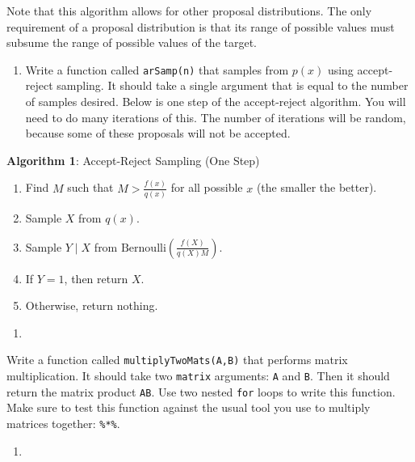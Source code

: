 \documentclass[
  12pt,
  krantz2]{krantz}
\providecommand{\tightlist}{%
  \setlength{\itemsep}{0pt}\setlength{\parskip}{0pt}}
\begin{document}
Note that this algorithm allows for other proposal distributions. The only requirement of a proposal distribution is that its range of possible values must subsume the range of possible values of the target.

\begin{enumerate}
\def\labelenumi{\alph{enumi})}
\tightlist
\item
  Write a function called \texttt{arSamp(n)} that samples from \(p(x)\) using accept-reject sampling. It should take a single argument that is equal to the number of samples desired. Below is one step of the accept-reject algorithm. You will need to do many iterations of this. The number of iterations will be random, because some of these proposals will not be accepted.
\end{enumerate}

\textbf{Algorithm 1}: Accept-Reject Sampling (One Step)

\begin{enumerate}
\def\labelenumi{\roman{enumi}.}
\tightlist
\item
  Find \(M\) such that \(M > \frac{f(x)}{q(x)}\) for all possible \(x\) (the smaller the better).
\item
  Sample \(X\) from \(q(x)\).
\item
  Sample \(Y \mid X\) from \(\text{Bernoulli}\left(\frac{f(X)}{q(X)M}\right)\).
\item
  If \(Y = 1\), then return \(X\).
\item
  Otherwise, return nothing.
\end{enumerate}

\begin{enumerate}
\def\labelenumi{\arabic{enumi}.}
\setcounter{enumi}{2}
\tightlist
\item
\end{enumerate}

Write a function called \texttt{multiplyTwoMats(A,B)} that performs matrix multiplication. It should take two \texttt{matrix} arguments: \texttt{A} and \texttt{B}. Then it should return the matrix product \texttt{AB}. Use two nested \texttt{for} loops to write this function. Make sure to test this function against the usual tool you use to multiply matrices together: \texttt{\%*\%}.

\begin{enumerate}
\def\labelenumi{\arabic{enumi}.}
\setcounter{enumi}{3}
\tightlist
\item
\end{enumerate}
\end{document}
